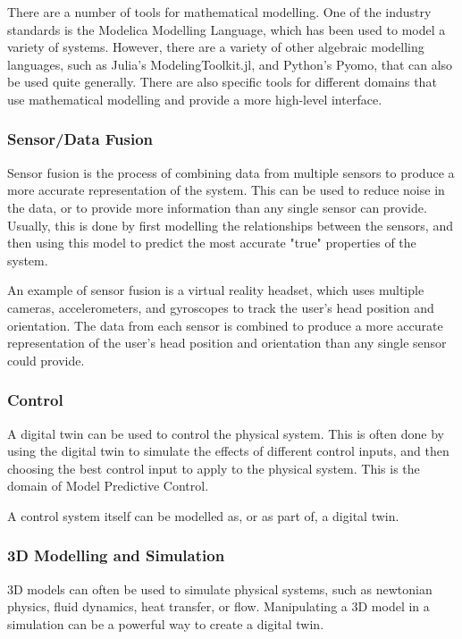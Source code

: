 There are a number of tools for mathematical modelling. One of the industry standards is the Modelica Modelling Language, which has been used to model a variety of systems. However, there are a variety of other algebraic modelling languages, such as Julia's ModelingToolkit.jl, and Python's Pyomo, that can also be used quite generally. There are also specific tools for different domains that use mathematical modelling and provide a more high-level interface.


\subsubsection{Sensor/Data Fusion}

Sensor fusion is the process of combining data from multiple sensors to produce a more accurate representation of the system. This can be used to reduce noise in the data, or to provide more information than any single sensor can provide. Usually, this is done by first modelling the relationships between the sensors, and then using this model to predict the most accurate "true" properties of the system. 

An example of sensor fusion is a virtual reality headset, which uses multiple cameras, accelerometers, and gyroscopes to track the user's head position and orientation. The data from each sensor is combined to produce a more accurate representation of the user's head position and orientation than any single sensor could provide.


\subsubsection{Control}

A digital twin can be used to control the physical system. This is often done by using the digital twin to simulate the effects of different control inputs, and then choosing the best control input to apply to the physical system. This is the domain of Model Predictive Control.

A control system itself can be modelled as, or as part of, a digital twin. %


\subsubsection{3D Modelling and Simulation}

3D models can often be used to simulate physical systems, such as newtonian physics, fluid dynamics, heat transfer, or flow. Manipulating a 3D model in a simulation can be a powerful way to create a digital twin. 

